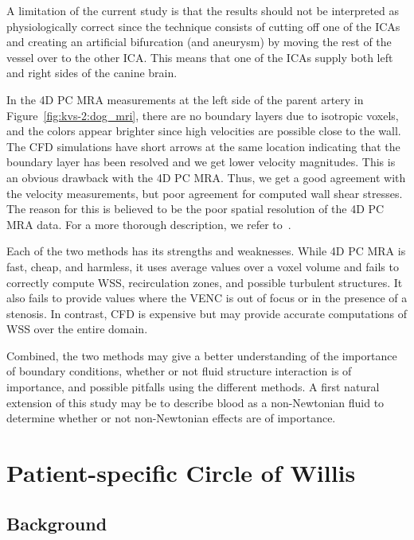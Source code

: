 A limitation of the current study is that the results should not be
interpreted as physiologically correct since the technique consists of
cutting off one of the ICAs and creating an artificial bifurcation
(and aneurysm) by moving the rest of the vessel over to the other
ICA. This means that one of the ICAs supply both left and right sides
of the canine brain.

In the 4D PC MRA measurements at the left side of the parent artery in
Figure~\ref{fig:kvs-2:dog_mri}, there are no boundary layers due to
isotropic voxels, and the colors appear brighter since high velocities
are possible close to the wall.  The CFD simulations have short arrows
at the same location indicating that the boundary layer has been
resolved and we get lower velocity magnitudes.
This is an obvious drawback with
the 4D PC MRA. Thus, we get a good agreement with the velocity
measurements, but poor agreement for computed wall shear stresses. The
reason for this is believed to be the poor spatial resolution of the
4D PC MRA data. For a more thorough description, we refer
to~\citet{JiangJohnsonValen-SendstadEtAl2010}.

Each of the two methods has its strengths and weaknesses. While 4D PC
MRA is fast, cheap, and harmless, it uses average values over a voxel
volume and fails to correctly compute WSS, recirculation zones, and
possible turbulent structures. It also fails to provide values where
the VENC is out of focus or in the presence of a stenosis. In
contrast, CFD is expensive but may provide accurate computations of
WSS over the entire domain.

Combined, the two methods may give a better understanding of the
importance of boundary conditions, whether or not fluid structure
interaction is of importance, and possible pitfalls using the
different methods. A first natural extension of this study may be to
describe blood as a non-Newtonian fluid to determine whether or not
non-Newtonian effects are of importance.

\section{Patient-specific Circle of Willis} \label{cok}

\subsection{Background}

